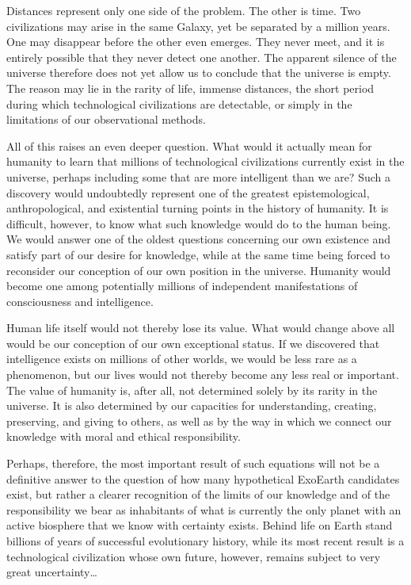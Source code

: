 Distances represent only one side of the problem. The other is time. Two civilizations may arise in the same Galaxy, yet be separated by a million years. One may disappear before the other even emerges. They never meet, and it is entirely possible that they never detect one another. The apparent silence of the universe therefore does not yet allow us to conclude that the universe is empty. The reason may lie in the rarity of life, immense distances, the short period during which technological civilizations are detectable, or simply in the limitations of our observational methods.

All of this raises an even deeper question. What would it actually mean for humanity to learn that millions of technological civilizations currently exist in the universe, perhaps including some that are more intelligent than we are? Such a discovery would undoubtedly represent one of the greatest epistemological, anthropological, and existential turning points in the history of humanity. It is difficult, however, to know what such knowledge would do to the human being. We would answer one of the oldest questions concerning our own existence and satisfy part of our desire for knowledge, while at the same time being forced to reconsider our conception of our own position in the universe. Humanity would become one among potentially millions of independent manifestations of consciousness and intelligence.

Human life itself would not thereby lose its value. What would change above all would be our conception of our own exceptional status. If we discovered that intelligence exists on millions of other worlds, we would be less rare as a phenomenon, but our lives would not thereby become any less real or important. The value of humanity is, after all, not determined solely by its rarity in the universe. It is also determined by our capacities for understanding, creating, preserving, and giving to others, as well as by the way in which we connect our knowledge with moral and ethical responsibility.

Perhaps, therefore, the most important result of such equations will not be a definitive answer to the question of how many hypothetical ExoEarth candidates exist, but rather a clearer recognition of the limits of our knowledge and of the responsibility we bear as inhabitants of what is currently the only planet with an active biosphere that we know with certainty exists. Behind life on Earth stand billions of years of successful evolutionary history, while its most recent result is a technological civilization whose own future, however, remains subject to very great uncertainty\ldots
